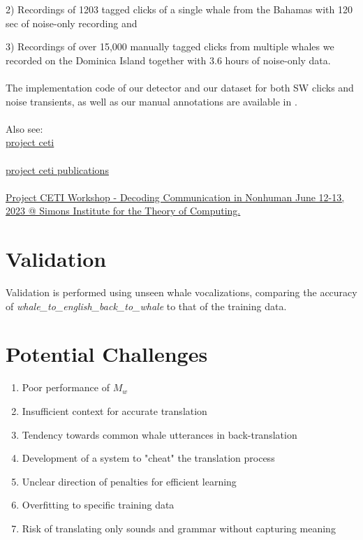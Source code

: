 \documentclass{article}
\begin{document}
2) Recordings of 1203 tagged clicks of a single whale from the Bahamas with 120 sec of noise-only recording and 

3) Recordings of over 15,000 manually tagged clicks from multiple whales we recorded on the Dominica Island together with 3.6 hours of noise-only data. \\ \\
The implementation code of our detector and our dataset for both SW clicks and noise transients, as well as our manual annotations are available in \cite{ceti}. \\ \\
Also see: \\
\href{https://www.projectceti.org/}{project ceti} \\ \\
\href{https://www.projectceti.org/news-research-insights#publications}{project ceti publications}
 \\ \\
\href{https://www.youtube.com/playlist?list=PL-7Ju3RM0_oUKDIfBWlsOhONsXimWfMlF}{Project CETI Workshop - Decoding Communication in Nonhuman June 12-13, 2023 @ Simons Institute for the Theory of Computing.}

\section{Validation}
Validation is performed using unseen whale vocalizations, comparing the accuracy of \textit{whale\_to\_english\_back\_to\_whale} to that of the training data.

\section{Potential Challenges}
\begin{enumerate}
    \item Poor performance of $M_w$
    \item Insufficient context for accurate translation
    \item Tendency towards common whale utterances in back-translation
    \item Development of a system to "cheat" the translation process
    \item Unclear direction of penalties for efficient learning
    \item Overfitting to specific training data
    \item Risk of translating only sounds and grammar without capturing meaning
\end{enumerate}
\end{document}
